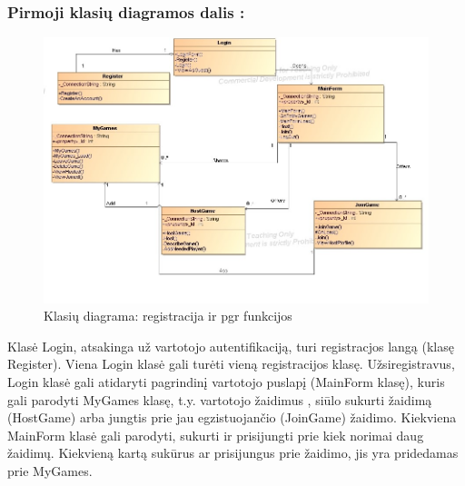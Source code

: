 \documentclass{VUMIFPSkursinis}
\begin{document}
		\subsubsection*{Pirmoji klasių diagramos dalis :}
			\begin{figure}[H]
				\centering
				\includegraphics[scale=0.5]{img/BoardGamesClassDiagram}
				\caption{Klasių diagrama: registracija ir pgr funkcijos}
				\label{img:BoardGamesClassDiagram}
			\end{figure}
			Klasė Login, atsakinga už vartotojo autentifikaciją, turi  registracjos langą (klasę Register). Viena Login klasė gali turėti vieną   registracijos klasę. Užsiregistravus, Login klasė gali atidaryti pagrindinį vartotojo puslapį (MainForm klasę), kuris gali parodyti MyGames klasę, t.y. vartotojo žaidimus , siūlo sukurti žaidimą (HostGame) arba jungtis prie jau egzistuojančio (JoinGame) žaidimo. Kiekviena MainForm klasė gali parodyti, sukurti ir prisijungti prie kiek norimai daug žaidimų. Kiekvieną kartą sukūrus ar prisijungus prie žaidimo, jis yra pridedamas prie MyGames. 
\end{document}
